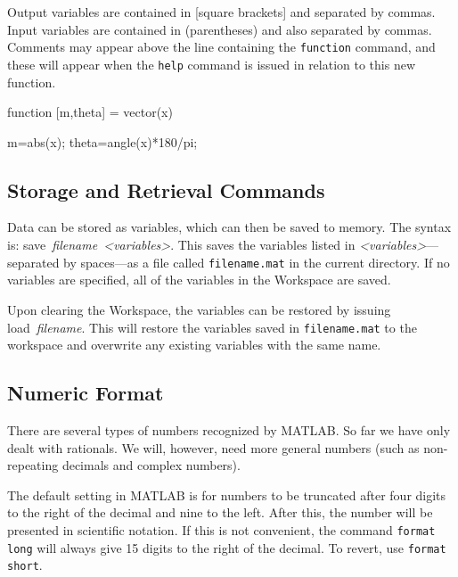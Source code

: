 Output variables are contained in [square brackets] and separated by commas. Input variables are contained in (parentheses) and also separated by commas.  Comments may appear above the line containing the \verb=function= command, and these will appear when the \verb=help= command is issued in relation to this new function.

\begin{codex}
%
%
%

function [m,theta] = vector(x)

m=abs(x);                  %
theta=angle(x)*180/pi;     %
\end{codex}

\subsection{Storage and Retrieval Commands}
Data can be stored as variables, which can then be saved to mem\-ory.  The syn\-tax is: \linebreak \mbox{\ttfamily save \textit{filename <variables>}}.  This saves the variables listed in \mbox{\ttfamily \textit{<variables>}}---separated by spaces---as a file called \verb=filename.mat= in the current directory.  If no variables are specified, all of the variables in the Workspace are saved.
\par
Upon clearing the Workspace, the variables can be restored by issuing \mbox{\ttfamily load \textit{filename}}.  This will restore the variables saved in \verb=filename.mat= to the workspace and overwrite any existing variables with the same name.

\subsection{Numeric Format}
There are several types of numbers recognized by MATLAB.  So far we have only dealt with rationals.  We will, however, need more general numbers (such as non-repeating decimals and complex numbers).
\par
The default setting in MATLAB is for numbers to be truncated after four digits to the right of the decimal and nine to the left.  After this, the number will be presented in scientific notation.  If this is not convenient, the command \verb=format long= will always give 15 digits to the right of the decimal.  To revert, use \verb=format short=.

